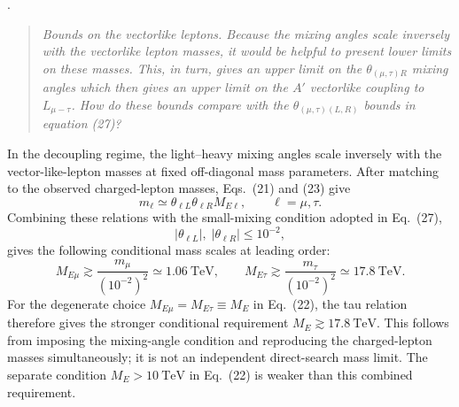 \documentclass[12pt,a4paper]{article}
\begin{document}
\medskip
{}.
\begin{quote}\itshape
Bounds on the vectorlike leptons. Because the mixing angles scale inversely with the vectorlike lepton masses, it would be helpful to present lower limits on these masses. This, in turn, gives an upper limit on the \(\theta_{(\mu,\tau)R}\) mixing angles which then gives an upper limit on the \(A'\) vectorlike coupling to \(L_{\mu-\tau}\). How do these bounds compare with the \(\theta_{(\mu,\tau)(L,R)}\) bounds in equation (27)?
\end{quote}


In the decoupling regime, the light--heavy mixing angles scale inversely with the vector-like-lepton masses at fixed off-diagonal mass parameters. After matching to the observed charged-lepton masses, Eqs.~(21) and (23) give
\[
m_\ell\simeq\theta_{\ell L}\theta_{\ell R}M_{E\ell},
\qquad \ell=\mu,\tau.
\]
Combining these relations with the small-mixing condition adopted in Eq.~(27),
\[
|\theta_{\ell L}|,\;|\theta_{\ell R}|\leq10^{-2},
\]
gives the following conditional mass scales at leading order:
\[
M_{E\mu}\gtrsim\frac{m_\mu}{(10^{-2})^2}\simeq1.06~\mathrm{TeV},
\qquad
M_{E\tau}\gtrsim\frac{m_\tau}{(10^{-2})^2}\simeq17.8~\mathrm{TeV}.
\]
For the degenerate choice \(M_{E\mu}=M_{E\tau}\equiv M_E\) in Eq.~(22), the tau relation therefore gives the stronger conditional requirement \(M_E\gtrsim17.8~\mathrm{TeV}\). This follows from imposing the mixing-angle condition and reproducing the charged-lepton masses simultaneously; it is not an independent direct-search mass limit. The separate condition \(M_E>10~\mathrm{TeV}\) in Eq.~(22) is weaker than this combined requirement.
\end{document}
